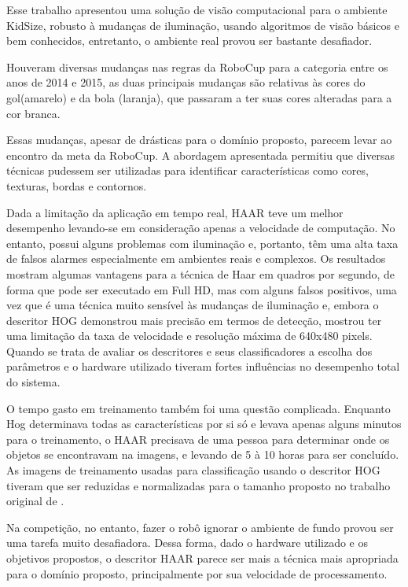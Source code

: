 
Esse trabalho apresentou uma solução de visão computacional para o ambiente KidSize, robusto à mudanças de iluminação, usando algoritmos de visão básicos e bem conhecidos, entretanto, o ambiente real provou ser bastante desafiador.

Houveram diversas mudanças nas regras da RoboCup para a categoria entre os anos de 2014 e 2015, as duas principais mudanças são relativas às cores do gol(amarelo) e da bola (laranja), que passaram a ter suas cores alteradas para a cor branca. 

Essas mudanças, apesar de drásticas para o domínio proposto, parecem levar ao encontro da meta da RoboCup. A abordagem apresentada permitiu que diversas técnicas pudessem ser utilizadas para identificar características como cores, texturas, bordas e contornos.

Dada a limitação da aplicação em tempo real, HAAR teve um melhor desempenho levando-se em consideração apenas a velocidade de computação. No entanto, possui alguns problemas com iluminação e, portanto, têm uma alta taxa de falsos alarmes especialmente em ambientes reais e complexos. Os resultados mostram algumas vantagens para a técnica de Haar em quadros por segundo, de forma que pode ser executado em Full HD, mas com alguns falsos positivos, uma vez que é uma técnica muito sensível às mudanças de iluminação e, embora o descritor HOG demonstrou mais precisão em termos de detecção, mostrou ter uma limitação da taxa de velocidade e resolução máxima de 640x480 pixels. Quando se trata de avaliar os descritores e seus classificadores a escolha dos parâmetros e o hardware utilizado tiveram fortes influências no desempenho total do sistema.

O tempo gasto em treinamento também foi uma questão complicada. Enquanto Hog determinava todas as características por si só e levava apenas alguns minutos para o treinamento, o HAAR precisava de uma pessoa para determinar onde os objetos se encontravam na imagens, e levando de 5 à 10 horas para ser concluído. As imagens de treinamento usadas para classificação usando o descritor HOG tiveram que ser reduzidas e normalizadas para o tamanho proposto no trabalho original de .

Na competição, no entanto, fazer o robô ignorar o ambiente de fundo provou ser uma tarefa muito desafiadora. Dessa forma, dado o hardware utilizado e os objetivos propostos, o descritor HAAR parece ser mais a técnica mais apropriada para o domínio proposto, principalmente por sua  velocidade de processamento. 

